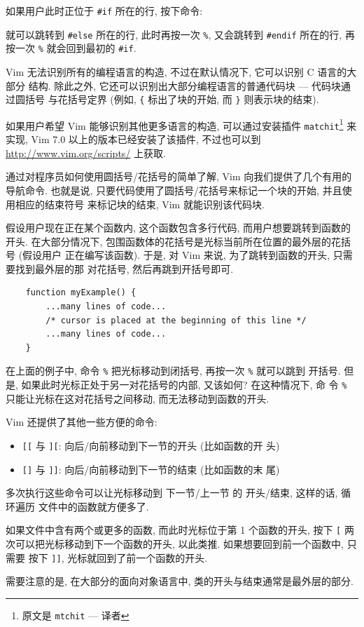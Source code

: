 如果用户此时正位于 \texttt{#if} 所在的行, 按下命令:
\begin{vimcmd}
%
\end{vimcmd}
就可以跳转到 \texttt{#else} 所在的行, 此时再按一次 \verb'%', 又会跳转到
\texttt{#endif} 所在的行, 再按一次 \verb'%' 就会回到最初的 \texttt{#if}.

Vim 无法识别所有的编程语言的构造, 不过在默认情况下, 它可以识别 C 语言的大部分
结构. 除此之外, 它还可以识别出大部分编程语言的普通代码块 --- 代码块通过圆括号
与花括号定界 (例如, \verb'{' 标出了块的开始, 而 \verb'}' 则表示块的结束).
\begin{warning}
    如果用户希望 Vim 能够识别其他更多语言的构造, 可以通过安装插件
    \texttt{matchit}\footnote{原文是 \texttt{mtchit} --- 译者} 来实现, Vim 7.0
    以上的版本已经安装了该插件, 不过也可以到 \url{http://www.vim.org/scripts/}
    上获取.
\end{warning}

通过对程序员如何使用圆括号/花括号的简单了解, Vim 向我们提供了几个有用的导航命令.
也就是说, 只要代码使用了圆括号/花括号来标记一个块的开始, 并且使用相应的结束符号
来标记块的结束, Vim 就能识别该代码块.

假设用户现在正在某个函数内, 这个函数包含多行代码, 而用户想要跳转到函数的开头.
在大部分情况下, 包围函数体的花括号是光标当前所在位置的最外层的花括号 (假设用户
正在编写该函数). 于是, 对 Vim 来说, 为了跳转到函数的开头, 只需要找到最外层的那
对花括号, 然后再跳到开括号即可.
\begin{verbatim}
    function myExample() {
        ...many lines of code...
        /* cursor is placed at the beginning of this line */
        ...many lines of code...
    }
\end{verbatim}
在上面的例子中, 命令 \verb'%' 把光标移动到闭括号, 再按一次 \verb'%' 就可以跳到
开括号. 但是, 如果此时光标正处于另一对花括号的内部, 又该如何? 在这种情况下, 命
令 \verb'%' 只能让光标在这对花括号之间移动, 而无法移动到函数的开头.

Vim 还提供了其他一些方便的命令:
\begin{itemize}
    \item \texttt{[[} 与  \texttt{][}: 向后/向前移动到下一节的开头 (比如函数的开
        头)
    \item \texttt{[]} 与  \texttt{]]}: 向后/向前移动到下一节的结束 (比如函数的末
        尾)
\end{itemize}
多次执行这些命令可以让光标移动到 下一节/上一节 的 开头/结束, 这样的话, 循环遍历
文件中的函数就方便多了.

如果文件中含有两个或更多的函数, 而此时光标位于第 1 个函数的开头, 按下 \texttt{[}
两次可以把光标移动到下一个函数的开头, 以此类推. 如果想要回到前一个函数中, 只需要
按下 \texttt{]]}, 光标就回到了前一个函数的开头.
\begin{warning}
    需要注意的是, 在大部分的面向对象语言中, 类的开头与结束通常是最外层的部分.
\end{warning}

